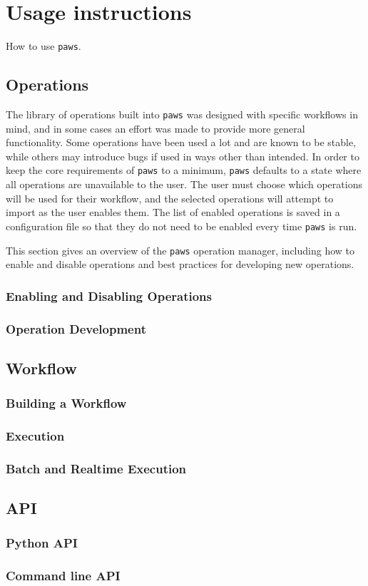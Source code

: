 \section{Usage instructions}
\label{sec:usage}

How to use \verb|paws|.

\subsection{Operations}

The library of operations built into \verb|paws|
was designed with specific workflows in mind,
and in some cases an effort was made to provide more general functionality.
Some operations have been used a lot and are known to be stable,
while others may introduce bugs if used in ways other than intended.
In order to keep the core requirements of \verb|paws| to a minimum,
\verb|paws| defaults to a state where all operations are unavailable to the user.
The user must choose which operations will be used for their workflow,
and the selected operations will attempt to import as the user enables them.
The list of enabled operations is saved in a configuration file
so that they do not need to be enabled every time \verb|paws| is run.

This section gives an overview of
the \verb|paws| operation manager, 
including how to enable and disable operations
and best practices for developing new operations.

\subsubsection{Enabling and Disabling Operations}

\subsubsection{Operation Development}


\subsection{Workflow}

\subsubsection{Building a Workflow}

\subsubsection{Execution}

\subsubsection{Batch and Realtime Execution}


\subsection{API}

\subsubsection{Python API}

\subsubsection{Command line API}



